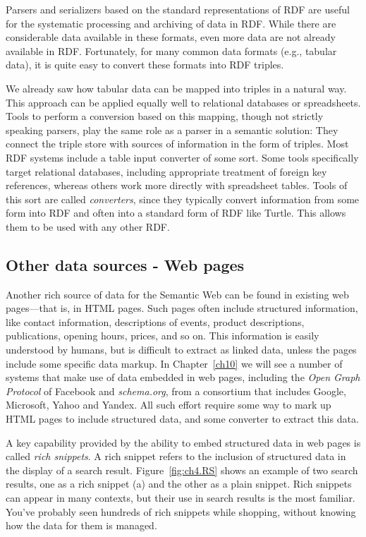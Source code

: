 Parsers and serializers based on the standard representations of RDF are
useful for the systematic processing and archiving of data in RDF. While
there are considerable data available in these formats, even more data
are not already available in RDF. Fortunately, for many common data
formats (e.g., tabular data), it is quite easy to convert these formats
into RDF triples.

We already saw how tabular data can be mapped into triples in a natural
way. This approach can be applied equally well to relational databases or
spreadsheets. Tools to perform a conversion based on this mapping,
though not strictly speaking parsers, play the same role as a parser in
a semantic solution: They connect the triple store with sources of
information in the form of triples. Most RDF systems include a table
input converter of some sort. Some tools specifically target relational
databases, including appropriate treatment of foreign key references,
whereas others work more directly with spreadsheet tables. Tools of this
sort are called \emph{converters}, since they typically convert information
from some form into RDF and often into a standard form of RDF like
Turtle. This allows them to be used with any other RDF. 


\subsection{Other data sources - Web pages}
\label{webembed}

Another rich
source of data for the Semantic Web can be found in existing web
pages---that is, in HTML pages. Such pages often include structured
information, like contact information, descriptions of events, product
descriptions, publications, opening hours, prices, and so on. This information is 
easily understood by humans, but is difficult to extract as linked
data, unless the pages include some specific data markup.   In Chapter~\ref{ch10} 
we will see a number of systems that make use of data embedded in web pages, including 
the \emph{Open Graph Protocol} of Facebook and \emph{schema.org}, from a consortium that
includes Google, Microsoft, Yahoo and Yandex.   All such effort require some way to
mark up HTML pages to include structured data, and some converter to extract this data. 

A key capability provided by the ability to embed structured data in web pages is 
called \emph{rich snippets}.  A rich snippet refers to the inclusion of structured
data in the display of a search result.  Figure~\ref{fig:ch4.RS} shows an example of two 
search results, one as a rich snippet (a) and the other as a plain snippet.  Rich snippets
can appear in many contexts, but their use in search results is the most familiar. 
You've probably seen hundreds of rich snippets while shopping, without knowing how
the data for them is managed. 

